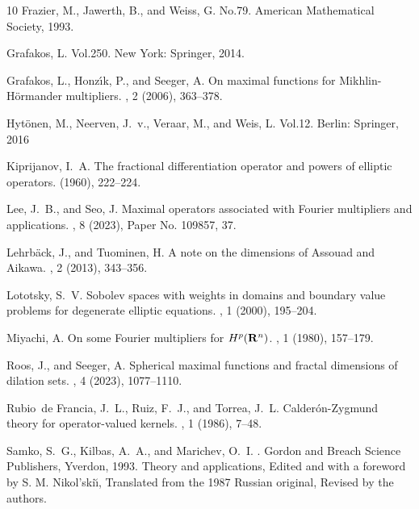 \documentclass[11pt]{amsart}
\theoremstyle{plain}
\theoremstyle{definition}
\theoremstyle{remark}
\numberwithin{equation}{section}
\begin{document}
\begin{thebibliography}{10}
{\sc Frazier, M., Jawerth, B., and Weiss, G.}
\newblock No.79. American Mathematical Society, 1993.

{\sc Grafakos, L.}
\newblock Vol.250. New York: Springer, 2014.

{\sc Grafakos, L., Honz\'{\i}k, P., and Seeger, A.}
\newblock On maximal functions for {M}ikhlin-{H}\"{o}rmander multipliers.
, 2 (2006), 363--378.

{\sc Hyt\"onen, M., Neerven, J.~v., Veraar, M., and Weis, L.}
\newblock Vol.12. Berlin: Springer, 2016

{\sc Kiprijanov, I.~A.}
\newblock The fractional differentiation operator and powers of elliptic operators.
 (1960), 222--224.

{\sc Lee, J.~B., and Seo, J.}
\newblock Maximal operators associated with {F}ourier multipliers and applications.
, 8 (2023), Paper No. 109857, 37.

{\sc Lehrb\"{a}ck, J., and Tuominen, H.}
\newblock A note on the dimensions of {A}ssouad and {A}ikawa.
, 2 (2013), 343--356.

{\sc Lototsky, S.~V.}
\newblock Sobolev spaces with weights in domains and boundary value problems for degenerate elliptic equations.
, 1 (2000), 195--204.

{\sc Miyachi, A.}
\newblock On some {F}ourier multipliers for {$H^{p}({\bf R}^{n})$}.
, 1 (1980), 157--179.

{\sc Roos, J., and Seeger, A.}
\newblock Spherical maximal functions and fractal dimensions of dilation sets.
, 4 (2023), 1077--1110.

{\sc Rubio~de Francia, J.~L., Ruiz, F.~J., and Torrea, J.~L.}
\newblock Calder\'{o}n-{Z}ygmund theory for operator-valued kernels.
, 1 (1986), 7--48.

{\sc Samko, S.~G., Kilbas, A.~A., and Marichev, O.~I.}
.
\newblock Gordon and Breach Science Publishers, Yverdon, 1993.
\newblock Theory and applications, Edited and with a foreword by S. M. Nikol'ski\u{\i}, Translated from the 1987 Russian original, Revised by the authors.


\end{thebibliography}
\end{document}
